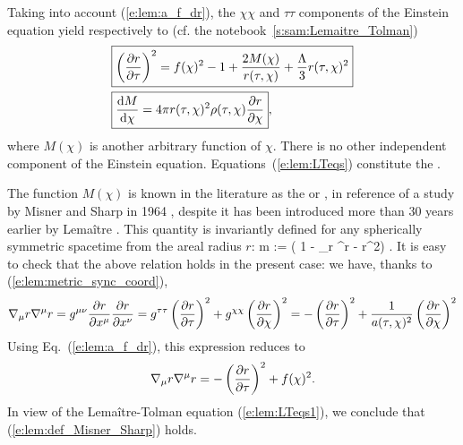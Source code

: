 Taking into account (\ref{e:lem:a_f_dr}), the $\chi\chi$ and $\tau\tau$ components of the Einstein equation
yield respectively to (cf. the notebook~\ref{s:sam:Lemaitre_Tolman})
\begin{subequations}\label{e:lem:LTeqs}
\begin{align}
 & \fbox{$\displaystyle \left( \frac{\partial r}{\partial \tau} \right) ^2 = f(\chi)^2 - 1 + \frac{2M(\chi)}{r(\tau,\chi)}
   + \frac{\Lambda}{3} r(\tau,\chi)^2 $} \label{e:lem:LTeqs1} \\
 & \fbox{$\displaystyle \frac{\mathrm{d} M}{\mathrm{d}\chi} = 4\pi r(\tau,\chi)^2 \rho(\tau,\chi) \frac{\partial r}{\partial \chi} $} ,
    \label{e:lem:LTeqs2}
 \end{align}
\end{subequations}
where $M(\chi)$ is another arbitrary function of $\chi$.
There is no other independent component of the Einstein equation.
Equations~(\ref{e:lem:LTeqs}) constitute the
.

The function $M(\chi)$ is known in the literature as the  or , in reference
of a study by Misner and Sharp in 1964 \cite{MisneS64}, despite it has been introduced
more than 30 years earlier by Lemaître \cite{Lemai32}. This quantity is
invariantly defined for any spherically symmetric spacetime from the areal radius $r$:
\be \label{e:lem:def_Misner_Sharp}
    m  :=  \left( 1 - \nabla_\mu r \nabla^\mu r  -  r^2\right) .
\ee
It is easy to check that the above relation holds in the present case:
we have, thanks to (\ref{e:lem:metric_sync_coord}),
\[
    \nabla_\mu r \nabla^\mu r = g^{\mu\nu} \frac{\partial r}{\partial x^\mu} \frac{\partial r}{\partial x^\nu}
        = g^{\tau\tau} \left( \frac{\partial r}{\partial \tau} \right)^2
        + g^{\chi\chi} \left( \frac{\partial r}{\partial \chi} \right)^2
        = - \left( \frac{\partial r}{\partial \tau} \right)^2 + \frac{1}{a(\tau,\chi)^2} \left( \frac{\partial r}{\partial \chi} \right)^2
\]
Using Eq.~(\ref{e:lem:a_f_dr}), this expression reduces to
\[
    \nabla_\mu r \nabla^\mu r = - \left( \frac{\partial r}{\partial \tau} \right)^2 + f(\chi)^2 .
\]
In view of the Lemaître-Tolman equation (\ref{e:lem:LTeqs1}), we conclude that
(\ref{e:lem:def_Misner_Sharp}) holds.

